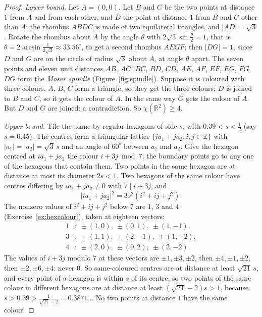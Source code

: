 \begin{proof}
\emph{Lower bound.} Let $A=(0,0)$. Let $B$ and $C$ be the two points at distance $1$ from $A$ and from each other, and $D$ the point at distance $1$ from
$B$ and $C$ other than $A$: the rhombus $ABDC$ is made of two equilateral triangles, and $|AD|=\sqrt3$. Rotate the rhombus about $A$ by the angle
$\theta$ with $2\sqrt3\sin\frac\theta2=1$, that is $\theta=2\arcsin\frac1{2\sqrt3}\approx33.56^\circ$, to get a second rhombus $AEGF$; then $|DG|=1$,
since $D$ and $G$ are on the circle of radius $\sqrt3$ about $A$, at angle $\theta$ apart. The seven points and eleven unit distances
$AB$, $AC$, $BC$, $BD$, $CD$, $AE$, $AF$, $EF$, $EG$, $FG$, $DG$ form the \emph{Moser spindle} (Figure~\ref{fig:spindle}). Suppose it is coloured with
three colours. $A$, $B$, $C$ form a triangle, so they get the three colours; $D$ is joined to $B$ and $C$, so it gets the colour of $A$. In the same way
$G$ gets the colour of $A$. But $D$ and $G$ are joined: a contradiction. So $\chi(\mathbb R^2)\ge4$.

\emph{Upper bound.} Tile the plane by regular hexagons of side $s$, with $0.39<s<\frac12$ (say $s=0.45$). The centres form a triangular lattice
$\{ia_1+ja_2:i,j\in\mathbb Z\}$ with $|a_1|=|a_2|=\sqrt3\,s$ and an angle of $60^\circ$ between $a_1$ and $a_2$. Give the hexagon centred at $ia_1+ja_2$
the colour $i+3j\bmod7$; the boundary points go to any one of the hexagons that contain them. Two points in the same hexagon are at distance at most its
diameter $2s<1$. Two hexagons of the same colour have centres differing by $ia_1+ja_2\ne0$ with $7\mid i+3j$, and
\[
|ia_1+ja_2|^2=3s^2(i^2+ij+j^2).
\]
The nonzero values of $i^2+ij+j^2$ below $7$ are $1$, $3$ and $4$ (Exercise~\ref{ex:hexcolour}), taken at eighteen vectors:
\[
\begin{aligned}
1&:\ \pm(1,0),\ \pm(0,1),\ \pm(1,-1),\\
3&:\ \pm(1,1),\ \pm(2,-1),\ \pm(1,-2),\\
4&:\ \pm(2,0),\ \pm(0,2),\ \pm(2,-2).
\end{aligned}
\]
The values of $i+3j$ modulo $7$ at these vectors are $\pm1,\pm3,\pm2$, then $\pm4,\pm1,\pm2$, then $\pm2,\pm6,\pm4$: never $0$.
So same-coloured centres are at distance at least $\sqrt{21}\,s$, and every point of a hexagon is within $s$ of its centre, so two points of the same
colour in different hexagons are at distance at least $(\sqrt{21}-2)s>1$, because $s>0.39>\frac1{\sqrt{21}-2}=0.3871\ldots$ No two points at distance $1$
have the same colour.
\end{proof}

